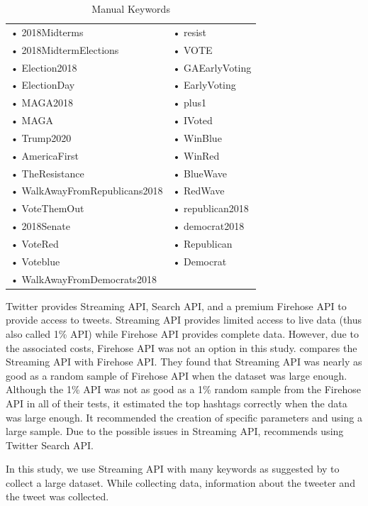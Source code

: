\documentclass[letterpaper]{article}
\begin{document}
\begin{table}[]
    \centering
    \begin{tabular}{ll}
    • 2018Midterms & • resist \\
    • 2018MidtermElections & • VOTE \\
    • Election2018 & • GAEarlyVoting \\
    • ElectionDay & • EarlyVoting \\
    • MAGA2018 & • plus1 \\
    • MAGA & • IVoted \\
    • Trump2020 & • WinBlue \\
    • AmericaFirst & • WinRed \\
    • TheResistance & • BlueWave \\
    • WalkAwayFromRepublicans2018 & • RedWave \\
    • VoteThemOut & • republican2018 \\
    • 2018Senate & • democrat2018 \\
    • VoteRed & • Republican \\
    • Voteblue & • Democrat \\
    • WalkAwayFromDemocrats2018 & 
    \end{tabular}
    \caption{Manual Keywords}
    \label{tab:manual-keywords}
\end{table}

Twitter provides Streaming API, Search API, and a premium Firehose API to provide access to tweets. Streaming API provides limited access to live data (thus also called 1\% API)
 while Firehose API
provides complete data. However, due to the associated costs, Firehose API was not an option in this study. \cite{morstatter2013sample} compares the Streaming API with Firehose API.
They found that Streaming API was nearly as good as a random sample of Firehose API when the dataset was large enough. Although the 1\% API was not as good as a 1\% random sample from the Firehose API in 
all of their tests, it estimated the top hashtags correctly when the data was large enough. It recommended the creation of specific parameters and using a large sample. 
Due to the possible issues in Streaming API, \cite{bessi2016social} recommends using Twitter Search API. 

\par In this study, we use Streaming API with many keywords as suggested by \cite{morstatter2013sample} to collect a large dataset. While collecting data, information about the tweeter and the tweet was collected. 
\end{document}
